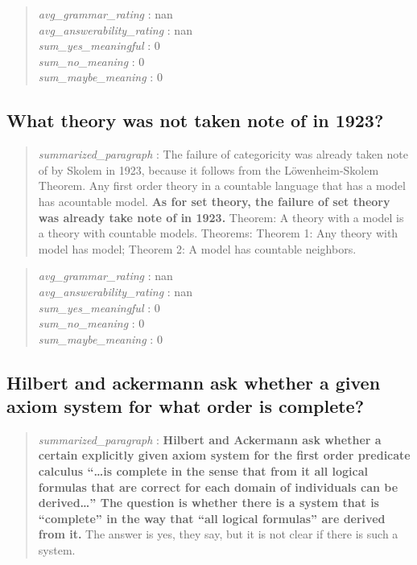 \begin{quote}
\emph{avg\_grammar\_rating} : nan\\
\emph{avg\_answerability\_rating} : nan\\
\emph{sum\_yes\_meaningful} : 0\\
\emph{sum\_no\_meaning} : 0\\
\emph{sum\_maybe\_meaning} : 0
\end{quote}

\hypertarget{what-theory-was-not-taken-note-of-in-1923}{%
\subsection{What theory was not taken note of in
1923?}\label{what-theory-was-not-taken-note-of-in-1923}}

\begin{quote}
\emph{summarized\_paragraph} : The failure of categoricity was already
taken note of by Skolem in 1923, because it follows from the
Löwenheim-Skolem Theorem. Any first order theory in a countable language
that has a model has acountable model. \textbf{As for set theory, the
failure of set theory was already take note of in 1923.} Theorem: A
theory with a model is a theory with countable models. Theorems: Theorem
1: Any theory with model has model; Theorem 2: A model has countable
neighbors.
\end{quote}

\begin{quote}
\emph{avg\_grammar\_rating} : nan\\
\emph{avg\_answerability\_rating} : nan\\
\emph{sum\_yes\_meaningful} : 0\\
\emph{sum\_no\_meaning} : 0\\
\emph{sum\_maybe\_meaning} : 0
\end{quote}

\hypertarget{hilbert-and-ackermann-ask-whether-a-given-axiom-system-for-what-order-is-complete}{%
\subsection{Hilbert and ackermann ask whether a given axiom system for
what order is
complete?}\label{hilbert-and-ackermann-ask-whether-a-given-axiom-system-for-what-order-is-complete}}

\begin{quote}
\emph{summarized\_paragraph} : \textbf{Hilbert and Ackermann ask whether
a certain explicitly given axiom system for the first order predicate
calculus ``\ldots is complete in the sense that from it all logical
formulas that are correct for each domain of individuals can be
derived\ldots{}'' The question is whether there is a system that is
``complete'' in the way that ``all logical formulas'' are derived from
it.} The answer is yes, they say, but it is not clear if there is such a
system.
\end{quote}

